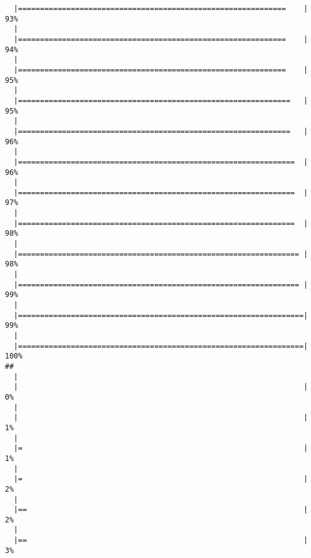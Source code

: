 \begin{knitrout}
\begin{kframe}
\begin{verbatim}
  |=============================================================    |  93%
  |                                                                       
  |=============================================================    |  94%
  |                                                                       
  |=============================================================    |  95%
  |                                                                       
  |==============================================================   |  95%
  |                                                                       
  |==============================================================   |  96%
  |                                                                       
  |===============================================================  |  96%
  |                                                                       
  |===============================================================  |  97%
  |                                                                       
  |===============================================================  |  98%
  |                                                                       
  |================================================================ |  98%
  |                                                                       
  |================================================================ |  99%
  |                                                                       
  |=================================================================|  99%
  |                                                                       
  |=================================================================| 100%
## 
  |                                                                       
  |                                                                 |   0%
  |                                                                       
  |                                                                 |   1%
  |                                                                       
  |=                                                                |   1%
  |                                                                       
  |=                                                                |   2%
  |                                                                       
  |==                                                               |   2%
  |                                                                       
  |==                                                               |   3%

\end{verbatim}
\end{kframe}
\end{knitrout}
